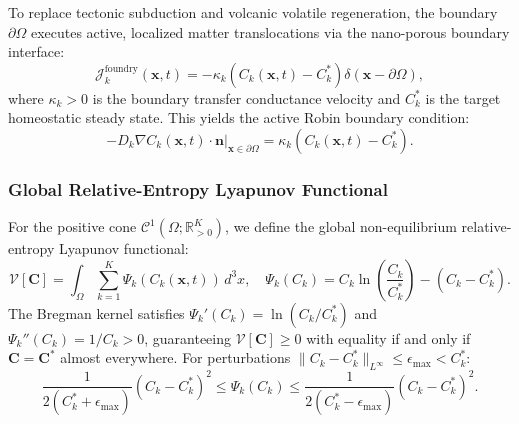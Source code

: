 \documentclass[11pt,onecolumn]{article}
\begin{document}
To replace tectonic subduction and volcanic volatile regeneration, the boundary $\partial\Omega$ executes active, localized matter translocations via the nano-porous boundary interface:
\begin{equation}
\label{eq:foundry_current_dirac}
\mathcal{J}_k^{\mathrm{foundry}}(\mathbf{x}, t) = -\kappa_k \left( C_k(\mathbf{x}, t) - C_k^* \right) \delta(\mathbf{x} - \partial\Omega),
\end{equation}
where $\kappa_k > 0$ is the boundary transfer conductance velocity and $C_k^*$ is the target homeostatic steady state. This yields the active Robin boundary condition:
\begin{equation}
\label{eq:active_robin_bc}
-D_k \nabla C_k(\mathbf{x}, t) \cdot \mathbf{n}\Big|_{\mathbf{x} \in \partial\Omega} = \kappa_k \left( C_k(\mathbf{x}, t) - C_k^* \right).
\end{equation}

\subsubsection{Global Relative-Entropy Lyapunov Functional}
For the positive cone $\mathcal{C}^1(\Omega; \mathbb{R}_{>0}^K)$, we define the global non-equilibrium relative-entropy Lyapunov functional:
\begin{equation}
\label{eq:lyapunov_functional_def}
\mathcal{V}[\mathbf{C}] = \int_\Omega \sum_{k=1}^K \Psi_k(C_k(\mathbf{x}, t)) \, d^3x, \quad \Psi_k(C_k) = C_k \ln\left( \frac{C_k}{C_k^*} \right) - (C_k - C_k^*).
\end{equation}
The Bregman kernel satisfies $\Psi_k'(C_k) = \ln(C_k/C_k^*)$ and $\Psi_k''(C_k) = 1/C_k > 0$, guaranteeing $\mathcal{V}[\mathbf{C}] \ge 0$ with equality if and only if $\mathbf{C} = \mathbf{C}^*$ almost everywhere. For perturbations $\|C_k - C_k^*\|_{L^\infty} \le \epsilon_{\max} < C_k^*$:
\begin{equation}
\label{eq:bregman_quadratic_envelope}
\frac{1}{2(C_k^* + \epsilon_{\max})} (C_k - C_k^*)^2 \le \Psi_k(C_k) \le \frac{1}{2(C_k^* - \epsilon_{\max})} (C_k - C_k^*)^2.
\end{equation}
\end{document}
